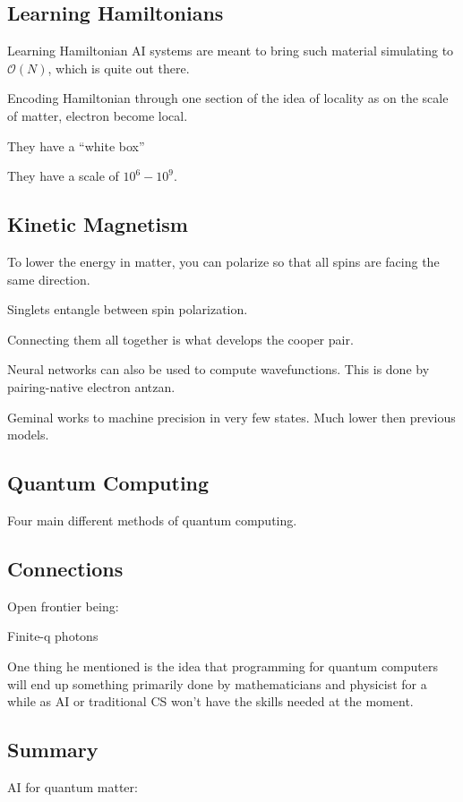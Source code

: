 \subsection{Learning Hamiltonians}

Learning Hamiltonian AI systems are meant to bring such material simulating to $\mathcal{O}(N)$, which is quite out there.

Encoding Hamiltonian through one section of the idea of locality as on the scale of matter, electron become local.

They have a ``white box''

They have a scale of $10^6 - 10^9$.


\subsection{Kinetic Magnetism}
To lower the energy in matter, you can polarize so that all spins are facing the same direction.

Singlets entangle between spin polarization.

Connecting them all together is what develops the cooper pair.

Neural networks can also be used to compute wavefunctions. This is done by pairing-native electron antzan.

Geminal works to machine precision in very few states. Much lower then previous models.



\subsection{Quantum Computing}

Four main different methods of quantum computing.
\subsection{Connections}

Open frontier being:

Finite-q photons

One thing he mentioned is the idea that programming for quantum computers will end up something primarily done by mathematicians and physicist for a while as AI or traditional CS won't have the skills needed at the moment.

\subsection{Summary}
AI for quantum matter:

